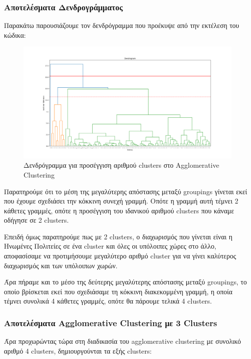 \documentclass[12pt,a4paper]{article}
\begin{document}
\subsubsection{Αποτελέσματα Δενδρογράμματος}

Παρακάτω παρουσιάζουμε τον δενδρόγραμμα που προέκυψε από την εκτέλεση του κώδικα:

\begin{figure}[H]
	\includegraphics[width=\textwidth]{Figures/Question2/1. Dendrogram.png}
	\caption{Δενδρόγραμμα για προσέγγιση αριθμού clusters στο Agglomerative Clustering}
\end{figure}

Παρατηρούμε ότι το μέση της μεγαλύτερης απόστασης μεταξύ groupings γίνεται εκεί που έχουμε σχεδιάσει την κόκκινη συνεχή γραμμή. Οπότε η γραμμή αυτή τέμνει 2 κάθετες γραμμές, οπότε η προσέγγιση του ιδανικού αριθμού clusters που κάναμε οδήγησε σε 2 clusters.

Επειδή όμως παρατηρούμε πως με 2 clusters, ο διαχωρισμός που γίνεται είναι η Ηνωμένες Πολιτείες σε ένα cluster και όλες οι υπόλοιπες χώρες στο άλλο, αποφασίσαμε να προτιμήσουμε μεγαλύτερο αριθμό cluster για να γίνει καλύτερος διαχωρισμός και των υπόλοιπων χωρών.

Άρα πήραμε και το μέσο της δεύτερης μεγαλύτερης απόστασης μεταξύ groupings, το οποίο βρίσκεται εκεί που σχεδιάσαμε τη κόκκινη διακεκομμένη γραμμή, η οποία τέμνει συνολικά 4 κάθετες γραμμές, οπότε θα πάρουμε τελικά 4 clusters.

\subsubsection{Αποτελέσματα Agglomerative Clustering με 3 Clusters}

Άρα προχωρώντας τώρα στη διαδικασία του agglomerative clustering με συνολικό αριθμό 4 clusters, δημιουργούνται τα εξής clusters:
\end{document}
